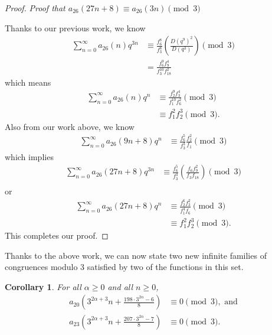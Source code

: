 \documentclass[10pt, reqno]{amsart}
\theoremstyle{theorem}
\newtheorem{corollary}[theorem]{Corollary}
\theoremstyle{definition}
\theoremstyle{example}
\begin{document}
\begin{proof}
\bigskip  

\noindent
{\it Proof that $a_{26}(27n+8) \equiv a_{26}(3n) \pmod{3}$}

\bigskip 

\noindent 
Thanks to our previous work, we know 
\begin{align*}
\sum_{n=0}^\infty a_{26}(n)q^{3n} 
&\equiv 
\frac{f_6^8}{f_3^8}\left( \frac{D(q^9)^2}{D(q^3)}  \right) \pmod{3}  \\
&=
\frac{f_6^9f_9^4}{f_3^{10}f_{18}^2}
\end{align*}
which means 
\begin{align*}
\sum_{n=0}^\infty a_{26}(n)q^{n} 
&\equiv 
\frac{f_2^9f_3^4}{f_1^{10}f_{6}^2} \pmod{3} \\
&\equiv 
f_1^2f_2^3 \pmod{3}.  
\end{align*}
Also from our work above, we know 
\begin{align*}
\sum_{n=0}^\infty a_{26}(9n+8)q^{n} 
&\equiv 
\frac{f_6^5}{f_3^3}\frac{f_2^2}{f_1} \pmod{3}
\end{align*}
which implies
\begin{align*}
\sum_{n=0}^\infty a_{26}(27n+8)q^{3n} 
&\equiv 
\frac{f_6^5}{f_3^3}\left(  \frac{f_6f_9^2}{f_3f_{18}} \right) \pmod{3} \\
\end{align*}
or
\begin{align*}
\sum_{n=0}^\infty a_{26}(27n+8)q^{n} 
&\equiv 
\frac{f_2^6f_3^2}{f_1^4f_{6}} \pmod{3} \\
&\equiv 
f_1^2f_2^3 \pmod{3}.  
\end{align*}
This completes our proof.  
\end{proof}

Thanks to the above work, we can now state two new infinite families of congruences modulo 3 satisfied by two of the functions in this set.  

\begin{corollary}
\label{cor:new_inf_families_mod3}
For all $\alpha \geq 0$ and all $n\geq 0$, 
\begin{align}
a_{20}\left(3^{2\alpha + 3}n + \frac{198\cdot 3^{2\alpha} - 6}{8}\right)  &\equiv 0 \pmod{3}, \text{\ and} \label{a20_inf_fam} \\
a_{23}\left(3^{2\alpha + 3}n + \frac{207\cdot 3^{2\alpha} - 7}{8}\right)  &\equiv 0 \pmod{3}. \label{a23_inf_fam} 
\end{align}
\end{corollary}
\end{document}
